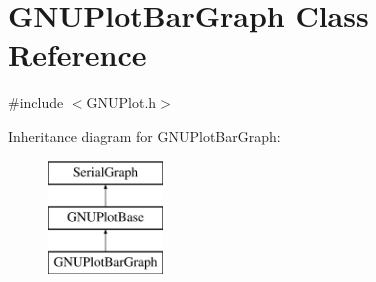 \hypertarget{class_g_n_u_plot_bar_graph}{}\section{G\+N\+U\+Plot\+Bar\+Graph Class Reference}
\label{class_g_n_u_plot_bar_graph}


{\ttfamily \#include $<$G\+N\+U\+Plot.\+h$>$}

Inheritance diagram for G\+N\+U\+Plot\+Bar\+Graph\+:\begin{figure}[H]
\begin{center}
\leavevmode
\includegraphics[height=3.000000cm]{class_g_n_u_plot_bar_graph}
\end{center}
\end{figure}
